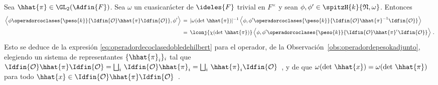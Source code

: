\begin{obsOperadorCoclaseAdelesAdjunto}%
	\label{obs:operadorcoclaseadelesadjunto}
	Sea $\hhat{\pi}\in\GL_{2}(\Adfin{F})$. Sea $\omega$ un
	cuasicar\'{a}cter de $\ideles{F}$ trivial en $F^{\times}$ y sean
	$\phi,\phi'\in\spitzH{k}{\frak{N},\omega}$. Entonces
	\begin{align*}
		\Big\langle \phi\operadorcoclases{\peso{k}}{%
			\Idfin{\cal{O}}\hhat{\pi}\Idfin{\cal{O}}},\phi'
			\Big\rangle & \,=\,|\omega(\det\,\hhat{\pi})|^{-1}\,
		\Big\langle\phi,\phi'\operadorcoclases{\peso{k}}{%
				\Idfin{\cal{O}}\hhat{\pi}^{-1}\Idfin{\cal{O}}}
			\Big\rangle \\
		& \,=\,\lconj{\chi(\det\,\hhat{\pi})}\,
			\Big\langle\phi,\phi'\operadorcoclases{\peso{k}}{%
				\Idfin{\cal{O}}\hhat{\pi}^\iota\Idfin{\cal{O}}}
			\Big\rangle
		\text{ .}
	\end{align*}
	Esto se deduce de la expresi\'{o}n
	\eqref{eq:operadordecoclasedobledehilbert} para el operador, de la
	Observaci\'{o}n~\ref{obs:operadordepesokadjunto}, elegiendo un sistema
	de representantes $\{\hhat{\pi}_{i}\}_{i}$ tal que
	\begin{math}
		\Idfin{\cal{O}}\hhat{\pi}\Idfin{\cal{O}}=
		\bigsqcup_{i}\,\Idfin{\cal{O}}\hhat{\pi}_{i}=
		\bigsqcup_{i}\,\hhat{\pi}_{i}\Idfin{\cal{O}}
	\end{math}~, y de que $\omega(\det\,\hhat{x})=\omega(\det\,\hhat{\pi})$
	para todo
	\begin{math}
		\hhat{x}\in\Idfin{\cal{O}}\hhat{\pi}\Idfin{\cal{O}}
	\end{math}~.
\end{obsOperadorCoclaseAdelesAdjunto}

